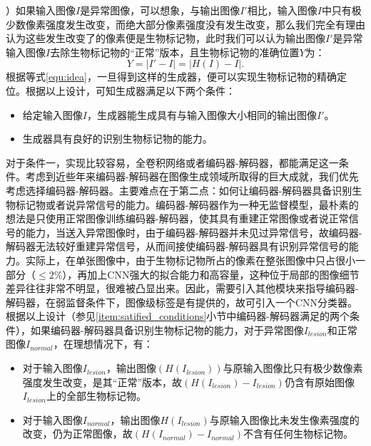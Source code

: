 ）如果输入图像$I$是异常图像，可以想象，与输出图像$I'$相比，输入图像$I$中只有极少数像素强度发生改变，而绝大部分像素强度没有发生改变，那么我们完全有理由认为这些发生改变了的像素便是生物标记物，此时我们可以认为输出图像$I'$是异常输入图像$I$去除生物标记物的“正常”版本，且生物标记物的准确位置$Y$为：
\begin{equation}\label{equ:idea}
Y=|I'-I|=|H(I) - I|.
\end{equation}
\noindent 根据等式\ref{equ:idea}，一旦得到这样的生成器，便可以实现生物标记物的精确定位。根据以上设计，可知生成器满足以下两个条件：
\begin{itemize}\label{item:satified_conditions}
	\item 给定输入图像$I$，生成器能生成具有与输入图像大小相同的输出图像$I'$。 
	\item 生成器具有良好的识别生物标记物的能力。
\end{itemize}
\noindent 对于条件一，实现比较容易，全卷积网络或者编码器-解码器，都能满足这一条件。考虑到近些年来编码器-解码器在图像生成领域所取得的巨大成就，我们优先考虑选择编码器-解码器。主要难点在于第二点：如何让编码器-解码器具备识别生物标记物或者说异常信号的能力。编码器-解码器作为一种无监督模型，最朴素的想法是只使用正常图像训练编码器-解码器，使其具有重建正常图像或者说正常信号的能力，当送入异常图像时，由于编码器-解码器并未见过异常信号，故编码器-解码器无法较好重建异常信号，从而间接使编码器-解码器具有识别异常信号的能力。实际上，在单张图像中，由于生物标记物所占的像素在整张图像中只占很小一部分（$\le 2\%$），再加上CNN强大的拟合能力和高容量，这种位于局部的图像细节差异往往非常不明显，很难被凸显出来。因此，需要引入其他模块来指导编码器-解码器，在弱监督条件下，图像级标签是有提供的，故可引入一个CNN分类器。根据以上设计（参见\ref{item:satified_conditions}小节中编码器-解码器满足的两个条件），如果编码器-解码器具备识别生物标记物的能力，对于异常图像$I_{lesion}$和正常图像$I_{normal}$，在理想情况下，有：
\begin{itemize}
	\item 对于输入图像$I_{lesion}$，输出图像$({H}(I_{lesion}))$与原输入图像比只有极少数像素强度发生改变，是其“正常”版本，故$({H}(I_{lesion})-I_{lesion})$仍含有原始图像$I_{lesion}$上的全部生物标记物。 
	\item 对于输入图像$I_{normal}$，输出图像${H}(I_{lesion})$与原输入图像比未发生像素强度的改变，仍为正常图像，故$({H}(I_{normal})-I_{normal})$不含有任何生物标记物。
\end{itemize}
